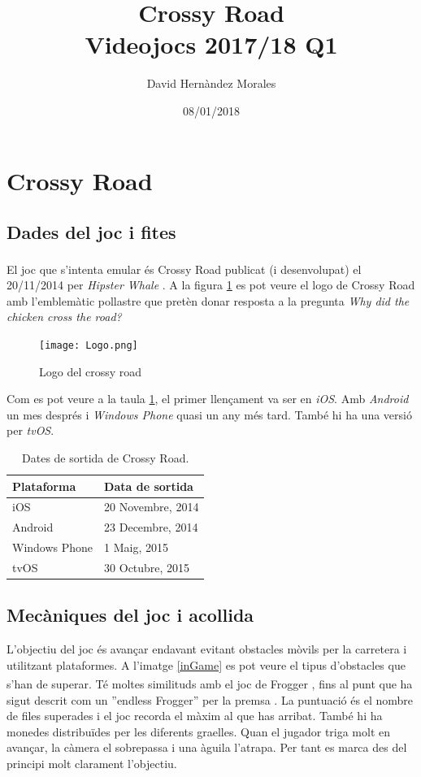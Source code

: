 \documentclass{article}
\title{Crossy Road \\
		\large Videojocs 2017/18 Q1}
\author{David Hernàndez Morales}
\date{08/01/2018}
\begin{document}
\maketitle
\newpage
\tableofcontents
\newpage
{}
\section{Crossy Road}
\subsection{Dades del joc i fites}
El joc que s'intenta emular és Crossy Road \textsuperscript{\texttrademark}
publicat (i desenvolupat) el 20/11/2014 per \textit{Hipster Whale} \cite{webCrossy}
\cite{wikipediaCrossy}. A la figura \ref{logo} es pot veure el logo de Crossy Road
amb l'emblemàtic pollastre que pretèn donar resposta a la pregunta
\textit{Why did the chicken cross the road?} \cite{preguntaChicken}

\begin{figure}[h!]
	\texttt{[image: Logo.png]}
	\caption{Logo del crossy road}
	\label{logo}
\end{figure}

Com es pot veure a la taula \ref{dadesSortida}, el primer llençament va ser en
\textit{iOS}. Amb \textit{Android} un mes després i \textit{Windows Phone}
quasi un any més tard. També hi ha una versió per \textit{tvOS}.

\begin{table}[h!]
	\begin{center}
		\label{dadesSortida}
		\begin{tabular}{l|l}
		\textbf{Plataforma} & \textbf{Data de sortida} \\
		\hline
		iOS & 20 Novembre, 2014 \\
		Android & 23 Decembre, 2014 \\
		Windows Phone & 1 Maig, 2015 \\
		tvOS & 30 Octubre, 2015
		\end{tabular}
		\caption{Dates de sortida de Crossy Road.}
	\end{center}
\end{table}

\subsection{Mecàniques del joc i acollida}

L'objectiu del joc és avançar endavant evitant obstacles mòvils per la
carretera i utilitzant plataformes. A l'imatge \ref{inGame}
es pot veure el tipus d'obstacles que s'han de superar.
Té moltes similituds amb el joc de
Frogger \textsuperscript{\texttrademark}, fins al punt que ha sigut
descrit com un ''endless Frogger'' per la premsa \cite{endlessFrogger1}
\cite{endlessFrogger2}. La puntuació és el nombre de files superades i
el joc recorda el màxim al que has arribat. També hi ha monedes distribuïdes
per les diferents graelles. Quan el jugador triga molt en avançar, la càmera
el sobrepassa i una àguila l'atrapa. Per tant es marca des del principi molt
clarament l'objectiu. \newline
\end{document}
